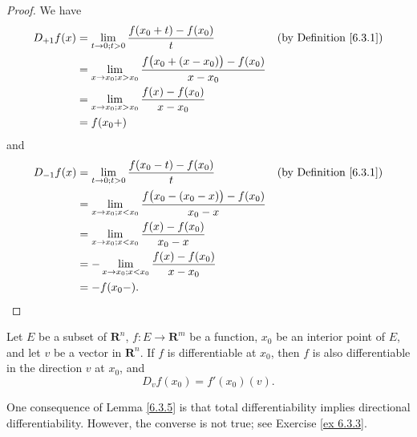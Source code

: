 \begin{proof}
    We have
    \begin{align*}
        D_{+1} f(x) & = \lim_{t \to 0 ; t > 0} \frac{f(x_0 + t) - f(x_0)}{t}                           & \text{(by Definition \ref{6.3.1})} \\
                    & = \lim_{x \to x_0 ; x > x_0} \frac{f\big(x_0 + (x - x_0)\big) - f(x_0)}{x - x_0}                                      \\
                    & = \lim_{x \to x_0 ; x > x_0} \frac{f(x) - f(x_0)}{x - x_0}                                                            \\
                    & = f(x_0+)
    \end{align*}
    and
    \begin{align*}
        D_{-1} f(x) & = \lim_{t \to 0 ; t > 0} \frac{f(x_0 - t) - f(x_0)}{t}                           & \text{(by Definition \ref{6.3.1})} \\
                    & = \lim_{x \to x_0 ; x < x_0} \frac{f\big(x_0 - (x_0 - x)\big) - f(x_0)}{x_0 - x}                                      \\
                    & = \lim_{x \to x_0 ; x < x_0} \frac{f(x) - f(x_0)}{x_0 - x}                                                            \\
                    & = -\lim_{x \to x_0 ; x < x_0} \frac{f(x) - f(x_0)}{x - x_0}                                                           \\
                    & = -f(x_0-).
    \end{align*}
\end{proof}

\setcounter{theorem}{4}
\begin{lemma}\label{6.3.5}
    Let \(E\) be a subset of \(\mathbf{R}^n\), \(f : E \to \mathbf{R}^m\) be a function, \(x_0\) be an interior point of \(E\), and let \(v\) be a vector in \(\mathbf{R}^n\).
    If \(f\) is differentiable at \(x_0\), then \(f\) is also differentiable in the direction \(v\) at \(x_0\), and
    \[
        D_v f(x_0) = f'(x_0)(v).
    \]
\end{lemma}

\begin{remark}\label{6.3.6}
    One consequence of Lemma \ref{6.3.5} is that total differentiability implies directional differentiability.
    However, the converse is not true;
    see Exercise \ref{ex 6.3.3}.
\end{remark}

